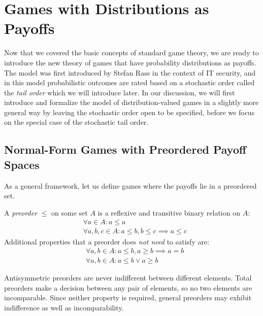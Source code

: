 \documentclass[a4paper]{scrreprt}
\begin{document}
    
    
    
    \chapter{Games with Distributions as Payoffs}
    Now that we covered the basic concepts of standard game theory, we are ready to introduce the new theory of games that have probability distributions as payoffs.
    The model was first introduced by Stefan Rass %
    in the context of IT security, and in this model probabilistic outcomes are rated based on a stochastic order called the \emph{tail order} which we will introduce later.
    In our discussion, we will first introduce and formalize the model of distribution-valued games in a slightly more general way by leaving the stochastic order open to be specified, before we focus on the special case of the stochastic tail order.
    
    \section{Normal-Form Games with Preordered Payoff Spaces}
    \label{sec:preorderedPayoffSpaceGames}
    
    As a general framework, let us define games where the payoffs lie in a preordered set.
    \begin{defn}[Preorder]
        A \emph{preorder} $\leq$ on some set $A$ is a reflexive and transitive binary relation on $A$:
        \begin{align*}
            &\forall a \in A: a \leq a \tag{Reflexivity} \\
            &\forall a, b, c \in A: a \leq b, b \leq c \implies a \leq c \tag{Transitivity}
        \end{align*}
        Additional properties that a preorder does \emph{not need} to satisfy are:
        \begin{align*}
            &\forall a, b \in A: a \leq b, a \geq b \implies a = b \tag{Antisymmetry} \\
            &\forall a, b \in A: a \leq b \vee a \geq b \tag{Totality}
        \end{align*}
    \end{defn}
    Antisymmetric preorders are never indifferent between different elements. Total preorders make a decision between any pair of elements, so no two elements are incomparable. Since neither property is required, general preorders may exhibit indifference as well as incomparability.
    
\end{document}
